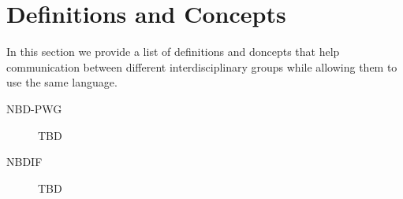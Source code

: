 
\section{Definitions and Concepts}
\label{sec:definitions}

In this section we provide a list of definitions and doncepts that
help communication between different interdisciplinary groups while
allowing them to use the same language.

\begin{description}

\item [NBD-PWG] TBD

\item[NBDIF] TBD

\end{description}

